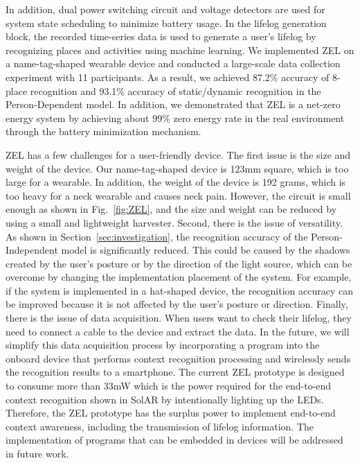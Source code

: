 \documentclass[conference]{IEEEtran}
\begin{document}
In addition, dual power switching circuit and voltage detectors are used for system state scheduling to minimize battery usage.
In the lifelog generation block, the recorded time-series data is used to generate a user's lifelog by recognizing places and activities using machine learning.
We implemented ZEL on a name-tag-shaped wearable device and conducted a large-scale data collection experiment with 11 participants.
As a result, we achieved 87.2\% accuracy of 8-place recognition and 93.1\% accuracy of static/dynamic recognition in the Person-Dependent model.
In addition, we demonstrated that ZEL is a net-zero energy system by achieving about 99\% zero energy rate in the real environment through the battery minimization mechanism.

ZEL has a few challenges for a user-friendly device.
The first issue is the size and weight of the device.
Our name-tag-shaped device is 123mm square, which is too large for a wearable.
In addition, the weight of the device is 192 grams, which is too heavy for a neck wearable and causes neck pain.
However, the circuit is small enough as shown in Fig.~\ref{fig:ZEL}, and the size and weight can be reduced by using a small and lightweight harvester\cite{doi:10.1021/acsami.9b00018}.
Second, there is the issue of versatility.
As shown in Section~\ref{sec:investigation}, the recognition accuracy of the Person-Independent model is significantly reduced.
This could be caused by the shadows created by the user's posture or by the direction of the light source, which can be overcome by changing the implementation placement of the system.
For example, if the system is implemented in a hat-shaped device, the recognition accuracy can be improved because it is not affected by the user's posture or direction.
Finally, there is the issue of data acquisition.
When users want to check their lifelog, they need to connect a cable to the device and extract the data.
In the future, we will simplify this data acquisition process by incorporating a program into the onboard device that performs context recognition processing and wirelessly sends the recognition results to a smartphone.
The current ZEL prototype is designed to consume more than 33mW which is the power required for the end-to-end context recognition shown in SolAR\cite{Sandhu2021SolAREP} by intentionally lighting up the LEDs. 
Therefore, the ZEL prototype has the surplus power to implement end-to-end context awareness, including the transmission of lifelog information.
The implementation of programs that can be embedded in devices will be addressed in future work. 
\end{document}
